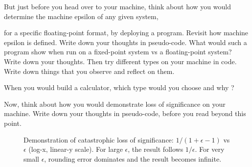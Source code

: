
 But just before you head over to your machine, think about how you would determine the machine epsilon of any given system, 

for a specific floating-point format, by deploying a program. Revisit how machine epsilon is defined. Write down your thoughts in pseudo-code. 
What would such a program show when run on a fixed-point system vs a floating-point system? Write down your thoughts. Then try different types on your machine in code.
Write down things that you observe and reflect on them. 

When you would build a calculator, which type would you choose and why \cite{blochingerfoliensatz}?




 Now, think about how you would demonstrate loss of significance on your machine. 
Write down your thoughts in pseudo-code, before you read beyond this point.
\vspace{2em}


\begin{figure}[h]

    \centering
    \caption{Demonstration of catastrophic loss of significance: $1/(1+\epsilon-1)$ vs $\epsilon$ (log-x, linear-y scale).
    For large $\epsilon$, the result follows $1/\epsilon$. For very small $\epsilon$, rounding error dominates and the result
    becomes infinite.}
    \label{fig:catastrophic_loss_significance}
\end{figure}

